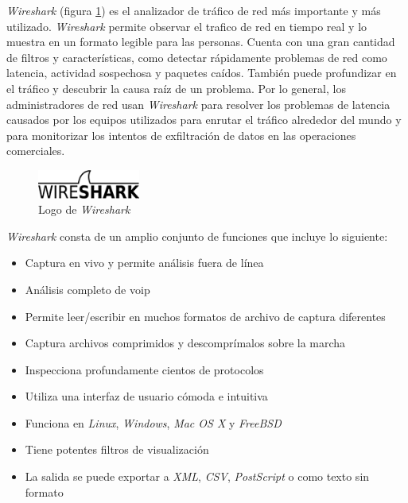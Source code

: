 \textit{Wireshark}\cite{wireshark} (figura \ref{fig:wire-logo}) es el analizador de tráfico de red más importante y más utilizado. \textit{Wireshark} permite observar el trafico de red en tiempo real y lo muestra en un formato legible para las personas. Cuenta con una gran cantidad de filtros y características, como detectar rápidamente problemas de red como latencia, actividad sospechosa y paquetes caídos. También puede profundizar en el tráfico y descubrir la causa raíz de un problema. Por lo general, los administradores de red usan \textit{Wireshark} para resolver los problemas de latencia causados por los equipos utilizados para enrutar el tráfico alrededor del mundo y para monitorizar los intentos de exfiltración de datos en las operaciones comerciales.\\

\begin{figure}[h]
    \centering
    \includegraphics[width=0.30\textwidth]{images/sections/tools/wireshark-logo.png}
    \caption{Logo de \textit{Wireshark}}
    \label{fig:wire-logo}
\end{figure}

\textit{Wireshark} consta de un amplio conjunto de funciones que incluye lo siguiente:

\begin{itemize}
    \item Captura en vivo y permite análisis fuera de línea
    \item Análisis completo de \acrshort{voip}
    \item Permite leer/escribir en muchos formatos de archivo de captura diferentes
    \item Captura archivos comprimidos y descomprímalos sobre la marcha
    \item Inspecciona profundamente cientos de protocolos
    \item Utiliza una interfaz de usuario cómoda e intuitiva
    \item Funciona en \textit{Linux}, \textit{Windows}, \textit{Mac OS X} y \textit{FreeBSD}
    \item Tiene potentes filtros de visualización
    \item La salida se puede exportar a \textit{XML}, \textit{CSV}, \textit{PostScript} o como texto sin formato
\end{itemize}

